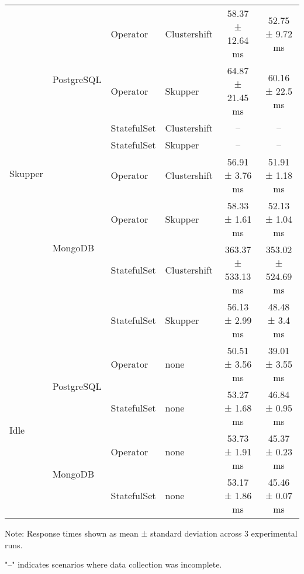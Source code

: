 \begin{table}[tb]
\begin{tabular}{@{}llllcc@{}}
    \midrule
    \multirow{8}{*}{Skupper} & \multirow{4}{*}{PostgreSQL} & Operator & Clustershift & 58.37 ± 12.64 ms & 52.75 ± 9.72 ms \\
     &  & Operator & Skupper & 64.87 ± 21.45 ms & 60.16 ± 22.5 ms \\
     &  & StatefulSet & Clustershift & -- & -- \\
     &  & StatefulSet & Skupper & -- & -- \\
    \cmidrule(lr){2-6}
     & \multirow{4}{*}{MongoDB} & Operator & Clustershift & 56.91 ± 3.76 ms & 51.91 ± 1.18 ms \\
     &  & Operator & Skupper & 58.33 ± 1.61 ms & 52.13 ± 1.04 ms \\
     &  & StatefulSet & Clustershift & 363.37 ± 533.13 ms & 353.02 ± 524.69 ms \\
     &  & StatefulSet & Skupper & 56.13 ± 2.99 ms & 48.48 ± 3.4 ms \\
    \midrule
    \multirow{4}{*}{Idle} & \multirow{2}{*}{PostgreSQL} & Operator & none & 50.51 ± 3.56 ms & 39.01 ± 3.55 ms \\
     &  & StatefulSet & none & 53.27 ± 1.68 ms & 46.84 ± 0.95 ms \\
    \cmidrule(lr){2-6}
     & \multirow{2}{*}{MongoDB} & Operator & none & 53.73 ± 1.91 ms & 45.37 ± 0.23 ms \\
     &  & StatefulSet & none & 53.17 ± 1.86 ms & 45.46 ± 0.07 ms \\
    \bottomrule
  \end{tabular}
  \begin{tablenotes}
    \small
    \item Note: Response times shown as mean ± standard deviation across 3 experimental runs.
    \item "--" indicates scenarios where data collection was incomplete.
  \end{tablenotes}
\end{table}
